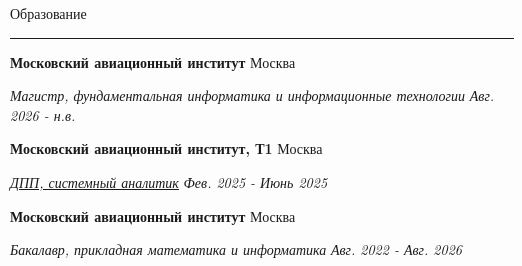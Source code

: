 \documentclass[14pt, a4paper, oneside]{extarticle}
\begin{document}
\begin{flushleft}
	\vspace{-\intextsep}
	\large Образование
\end{flushleft}

\vspace{-0.8\intextsep}
\hrule


\begin{flushleft}
	\vspace{-0.8\intextsep}
	\quad
	\textbf{Московский авиационный институт}
	\hfill
	Москва
\end{flushleft}

\begin{flushleft}
	\vspace{-\intextsep}
	\quad
	\textit{\footnotesize Магистр, фундаментальная информатика и информационные технологии} 
	\hfill
	\textit{\small Авг. 2026 - н.в.}
\end{flushleft}


\begin{flushleft}
	\vspace{-0.8\intextsep}
	\quad
	\textbf{Московский авиационный институт, Т1}
	\hfill
	Москва
\end{flushleft}

\begin{flushleft}
	\vspace{-\intextsep}
	\quad
	\href{https://github.com/Crazy5202/job_application_form/tree/main/portfolio/T1/%D0%A21_%D1%81%D0%B5%D1%80%D1%82%D0%B8%D1%84%D0%B8%D0%BA%D0%B0%D1%82.pdf}{\textit{ДПП, системный аналитик}}
	\hfill
	\textit{\small Фев. 2025 - Июнь 2025}
\end{flushleft}


\begin{flushleft}
	\vspace{-0.8\intextsep}
	\quad
	\textbf{Московский авиационный институт}
	\hfill
	Москва
\end{flushleft}

\begin{flushleft}
	\vspace{-\intextsep}
	\quad
	\textit{Бакалавр, прикладная математика и информатика}
	\hfill
	\textit{\small Авг. 2022 - Авг. 2026}
\end{flushleft}

\end{document}
